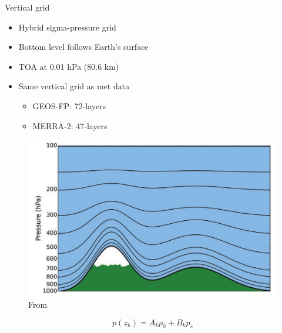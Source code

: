 \documentclass[10pt]{beamer}
\begin{document}
\begin{frame}[fragile]{Vertical grid}
    \begin{minipage}[c]{0.5\textwidth}
    \begin{itemize}
        \item Hybrid sigma-pressure grid
        \vspace{3mm}
        \item Bottom level follows Earth's surface
        \vspace{3mm}
        \item TOA at 0.01 hPa (80.6 km)
        \vspace{3mm}
        \item Same vertical grid as met data
        \vspace{3mm}
        \begin{itemize}
            \item GEOS-FP: 72-layers
            \vspace{3mm}
            \item MERRA-2: 47-layers
        \end{itemize}
    \end{itemize}
    \end{minipage}
    \begin{minipage}[c]{0.49\textwidth}
        \begin{figure}
            \centering
            \includegraphics[width=\textwidth]{hybrid-sigma-pressure.png}
            \captionsetup{labelformat=empty}
            \caption{From \cite{brasseur_modeling_2017}}
        \end{figure}
        $$
            p(z_k) = A_k p_0 + B_k p_s
        $$
    \end{minipage}
\end{frame}
\end{document}
